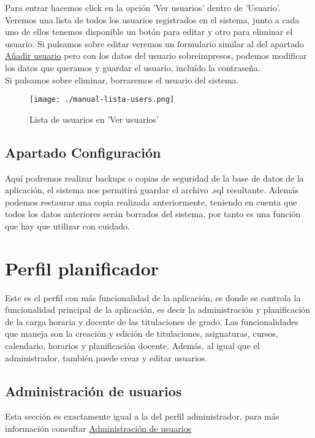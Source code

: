 Para entrar hacemos click en la opción 'Ver usuarios' dentro de 'Usuario'.\\

Veremos una lista de todos los usuarios registrados en el sistema, junto a cada uno de ellos tenemos disponible un botón para editar y otro para eliminar el usuario. Si pulsamos sobre editar veremos un formulario similar al del apartado \hyperref[manual-anadir-usuario]{Añadir usuario} pero con los datos del usuario sobreimpresos, podemos modificar los datos que queramos y guardar el usuario, incluído la contraseña.\\

Si pulsamos sobre eliminar, borraremos el usuario del sistema.

\begin{figure}[H] 
  \label{manual-lista-users} 
	\begin{center}
    \texttt{[image: ./manual-lista-users.png]}
  \end{center}
\caption{Lista de usuarios en 'Ver usuarios'}
\end{figure}

\subsection{Apartado Configuración}

Aquí podremos realizar backups o copias de seguridad de la base de datos de la aplicación, el sistema nos permitirá guardar el archivo .sql resultante. Además podemos restaurar una copia realizada anteriormente, teniendo en cuenta que todos los datos anteriores serán borrados del sistema, por tanto es una función que hay que utilizar con cuidado.

\section{Perfil planificador}
Este es el perfil con más funcionalidad de la aplicación, es donde se controla la funcionalidad principal de la aplicación, es decir la administración y planificación de la carga horaria y docente de las titulaciones de grado. Las funcionalidades que maneja son la creación y edición de titulaciones, asignaturas, cursos, calendario, horarios y planificación docente. Además, al igual que el administrador, también puede crear y editar usuarios.

\subsection{Administración de usuarios}
Esta sección es exactamente igual a la del perfil administrador, para más información consultar \hyperref[manual-administracion-usuarios]{Administración de usuarios}

